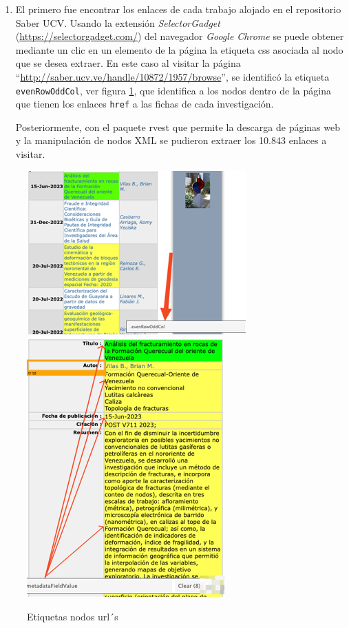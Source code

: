 \documentclass[
  12pt,
  openany]{book}
\begin{document}
\begin{enumerate}
\def\labelenumi{\arabic{enumi}.}
\item
  El primero fue encontrar los enlaces de cada trabajo alojado en el repositorio Saber UCV. Usando la extensión \emph{SelectorGadget} (\protect\hyperlink{0}{https://selectorgadget.com/}) del navegador \emph{Google Chrome} se puede obtener mediante un clic en un elemento de la página la etiqueta css asociada al nodo que se desea extraer. En este caso al visitar la página ``\protect\hyperlink{0}{http://saber.ucv.ve/handle/10872/1957/browse}'', se identificó la etiqueta \texttt{evenRowOddCol}, ver figura \ref{fig:nodosurl}, que identifica a los nodos dentro de la página que tienen los enlaces \texttt{href} a las fichas de cada investigación.

  Posteriormente, con el paquete rvest \citep{rvest} que permite la descarga de páginas web y la manipulación de nodos XML se pudieron extraer los 10.843 enlaces a visitar.
\end{enumerate}

\begin{figure}

{\centering \includegraphics[width=0.5\linewidth]{images/05-desarrollo/1_ciclo/Picture3} \includegraphics[width=0.5\linewidth]{images/05-desarrollo/1_ciclo/Picture2} 

}

\caption{Etiquetas nodos url´s}\label{fig:nodosurl}
\end{figure}
\end{document}

